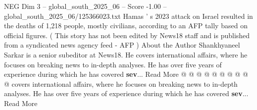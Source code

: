\begin{textsample}{NEG Dim 3 – global\_south\_2025\_06 – Score -1.00 – global\_south\_2025\_06/125366023.txt}
Hamas ' s 2023 attack on Israel resulted in the deaths of 1,218 people, mostly civilians, according to an AFP tally based on official figures. ( This story has not been edited by News18 staff and is published from a syndicated news agency feed - AFP ) About the Author Shankhyaneel Sarkar is a senior subeditor at News18.
He covers international affairs, where he focuses on breaking news to in-depth analyses.
He has over five years of experience during which he has covered \textbf{sev}...
Read More @ @ @ @ @ @ @ @ @ @ covers international affairs, where he focuses on breaking news to in-depth analyses.
He has over five years of experience during which he has covered \textbf{sev}...
Read More

\end{textsample}
